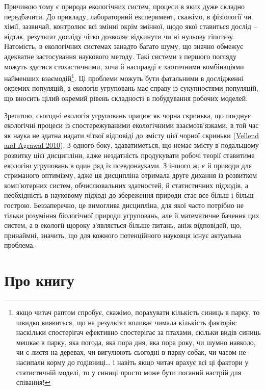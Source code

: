 \documentclass[
  11pt,
]{book}
\begin{document}
Причиною тому є природа екологічних систем, процеси в яких дуже складно передбачити. До прикладу, лабораторний експеримент, скажімо, в фізіології чи хімії, зазвичай, контролює всі змінні окрім змінної, щодо якої ставиться дослід -- відтак, результат досліду чітко дозволяє відкинути чи ні нульову гіпотезу. Натомість, в екологічних системах занадто багато шуму, що значно обмежує адекватне застосування наукового методу. Такі системи з першого погляду можуть здатися стохастичними, хоча й насправді є хаотичними комбінаціями найменших взаємодій\footnote{якщо читач раптом спробує, скажімо, порахувати кількість синиць в парку, то швидко виявиться, що на результат впливає чимала кількість факторів: наскільки спостерігач ефективно спостерігає за птахами, скільки видів синиць мешкає в парку, яка погода, яка пора дня, яка пора року, чи шумно навколо, чи є листя на деревах, чи вигулюють сьогодні в парку собак, чи часом не насипали корму до годівниці\ldots{} і навіть якщо читач врахує всі ці фактори у статистичній моделі, то у синиці просто може бути поганий настрій для співання!}. Ці проблеми можуть бути фатальними в дослідженні окремих популяцій, а екологія угруповань має справу із сукупностями популяцій, що вносить цілий окремий рівень складності в побудування робочих моделей.

Зрештою, сьогодні екологія угруповань працює як чорна скринька, що поєднує екологічні процеси із спостережуваними екологічними взаємозв'язками, в той час як наука не здатна надати чіткої відповіді до змісту цієї чорної скриньки (\href{https://doi.org/10.1086/652373}{Vellend and Agrawal 2010}). З одного боку, здаватиметься, що немає змісту в подальшому розвитку цієї дисципліни, адже нездатність продукувати робочі теорії ставитиме екологію угруповань в один ряд із псевдонауками. З іншого ж, є й приводи для стриманого оптимізму, адже ця дисципліна отримала друге дихання із розвитком комп'ютерних систем, обчислювальних здатностей, й статистичних підходів, а необхідність в науковому підході до збереження природи стає все більш і більш гострою. Беззаперечно, це вимоглива дисципліна, для якої часто потрібно не тільки розуміння біологічної природи угруповань, але й математичне бачення цих систем, а в екології щороку з'являється більше питань, аніж відповідей, що, принаймні, значить, що для кожного потенційного науковця існує актуальна проблема.

\chapter{Про книгу}\label{about-book}
\end{document}
